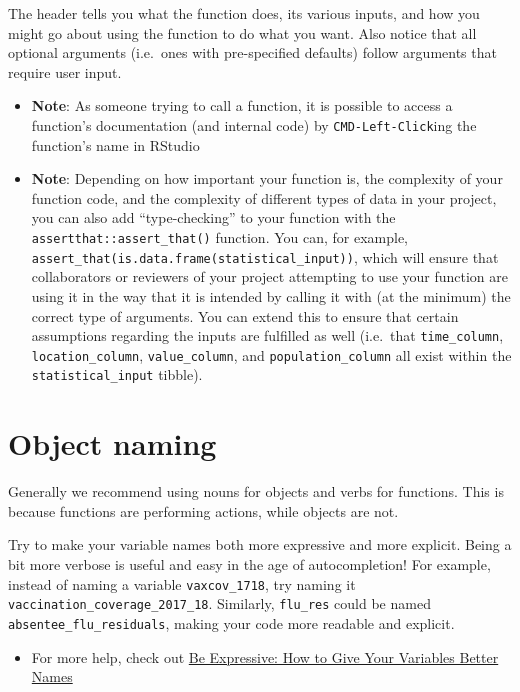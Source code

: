 \documentclass[]{book}
\providecommand{\tightlist}{%
  \setlength{\itemsep}{0pt}\setlength{\parskip}{0pt}}
\begin{document}
The header tells you what the function does, its various inputs, and how
you might go about using the function to do what you want. Also notice
that all optional arguments (i.e.~ones with pre-specified defaults)
follow arguments that require user input.

\begin{itemize}
\item
  \textbf{Note}: As someone trying to call a function, it is possible to
  access a function's documentation (and internal code) by
  \texttt{CMD-Left-Click}ing the function's name in RStudio
\item
  \textbf{Note}: Depending on how important your function is, the
  complexity of your function code, and the complexity of different
  types of data in your project, you can also add ``type-checking'' to
  your function with the \texttt{assertthat::assert\_that()} function.
  You can, for example,
  \texttt{assert\_that(is.data.frame(statistical\_input))}, which will
  ensure that collaborators or reviewers of your project attempting to
  use your function are using it in the way that it is intended by
  calling it with (at the minimum) the correct type of arguments. You
  can extend this to ensure that certain assumptions regarding the
  inputs are fulfilled as well (i.e.~that \texttt{time\_column},
  \texttt{location\_column}, \texttt{value\_column}, and
  \texttt{population\_column} all exist within the
  \texttt{statistical\_input} tibble).
\end{itemize}

\section{Object naming}\label{object-naming}

Generally we recommend using nouns for objects and verbs for functions.
This is because functions are performing actions, while objects are not.

Try to make your variable names both more expressive and more explicit.
Being a bit more verbose is useful and easy in the age of
autocompletion! For example, instead of naming a variable
\texttt{vaxcov\_1718}, try naming it
\texttt{vaccination\_coverage\_2017\_18}. Similarly, \texttt{flu\_res}
could be named \texttt{absentee\_flu\_residuals}, making your code more
readable and explicit.

\begin{itemize}
\tightlist
\item
  For more help, check out
  \href{https://spin.atomicobject.com/2017/11/01/good-variable-names/}{Be
  Expressive: How to Give Your Variables Better Names}
\end{itemize}
\end{document}
